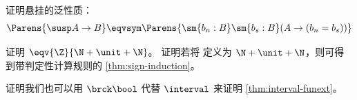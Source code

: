\begin{ex}\label{ex:susp-lump}
  证明悬挂的泛性质：
  \[ \Parens{\susp A \to B} \eqvsym \Parens{\sm{b_n : B} \sm{b_s : B} (A \to (b_n = b_s)) } \]
\end{ex}

\begin{ex}\label{ex:alt-integers}
  证明 $\eqv{\Z}{\N+\unit+\N}$。
  证明若将 \Z 定义为 $\N+\unit+\N$，则可得到带判定性计算规则的 \cref{thm:sign-induction}。
\end{ex}

\begin{ex}\label{ex:trunc-bool-interval}
  证明我们也可以用 $\brck \bool$ 代替 $\interval$ 来证明 \cref{thm:interval-funext}。
\end{ex}

%

